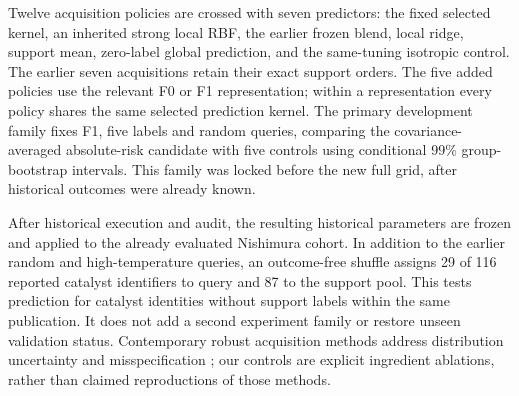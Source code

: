 Twelve acquisition policies are crossed with seven predictors: the fixed selected kernel, an inherited strong local RBF, the earlier frozen blend, local ridge, support mean, zero-label global prediction, and the same-tuning isotropic control. The earlier seven acquisitions retain their exact support orders. The five added policies use the relevant F0 or F1 representation; within a representation every policy shares the same selected prediction kernel. The primary development family fixes F1, five labels and random queries, comparing the covariance-averaged absolute-risk candidate with five controls using conditional 99\% group-bootstrap intervals. This family was locked before the new full grid, after historical outcomes were already known.

After historical execution and audit, the resulting historical parameters are frozen and applied to the already evaluated Nishimura cohort. In addition to the earlier random and high-temperature queries, an outcome-free shuffle assigns 29 of 116 reported catalyst identifiers to query and 87 to the support pool. This tests prediction for catalyst identities without support labels within the same publication. It does not add a second experiment family or restore unseen validation status. Contemporary robust acquisition methods address distribution uncertainty and misspecification \cite{takeno2025,tang2026}; our controls are explicit ingredient ablations, rather than claimed reproductions of those methods.
